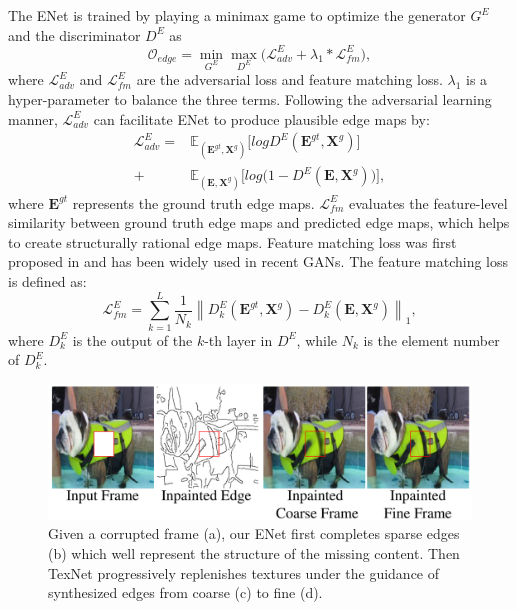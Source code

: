 The ENet is trained by playing a minimax game to optimize the generator $G^E$ and the discriminator $D^E$ as
\begin{equation}
\label{eq:loss_e}
\mathcal{O}_{edge} =\min\limits_{G^E} \max \limits_{D^E} \big(\mathcal{L}^E_{adv}+\lambda_1 * \mathcal{L}^E_{fm}\big),
\end{equation}
where $\mathcal{L}^E_{adv}$ and $\mathcal{L}^E_{fm}$ are the adversarial loss and feature matching loss. 
$\lambda_1$ is a hyper-parameter to balance the three terms.
%
Following the adversarial learning manner, $\mathcal{L}^E_{adv}$ can facilitate ENet to produce plausible edge maps by:
\begin{equation} \label{eq:edge_adver}
\begin{aligned} 
\mathcal{L}^E_{adv}  =&\mathbb{E}_{(\boldsymbol{E}^{gt},\boldsymbol{X}^{g})}\big[logD^E(\boldsymbol{E}^{gt},\boldsymbol{X}^{g})\big]\\ 
+&\mathbb{E}_{(\boldsymbol{E},\boldsymbol{X}^{g})}\big[log\big(1-D^E ( \boldsymbol{E},\boldsymbol{X}^{g})\big)\big],
\end{aligned}
\end{equation}
where $\boldsymbol{E}^{gt}$ represents the ground truth edge maps. $\mathcal{L}^E_{fm}$ evaluates the feature-level similarity between ground truth edge maps and predicted edge maps, which helps to create structurally rational edge maps. 
Feature matching loss was first proposed in \cite{wang2018high} and has been widely used in recent GANs.
The feature matching loss is defined as:
\begin{equation}
\label{eq:edge_fm}
\mathcal{L}^E_{fm}=\sum_{k=1}^L{\frac{1}{N_k}\left\| D^E_k(\boldsymbol{E}^{gt},\boldsymbol{X}^{g})- D^E_k(\boldsymbol{E},\boldsymbol{X}^{g})\right\|_1},
\end{equation}
where $D^E_k$ is the output of the $k$-th layer in $D^E$, while $N_k$ is the element number of $D^E_k$. 


\begin{figure}[t]
	\centering
	\includegraphics[width=1.0\columnwidth]{coars-fine} %
	\caption{Given a corrupted frame (a), our ENet first completes sparse edges (b) which well represent the structure of the missing content. Then TexNet progressively replenishes textures under the guidance of synthesized edges from coarse (c) to fine (d).}
	
	\label{fig:coarse-fine}
\end{figure}



